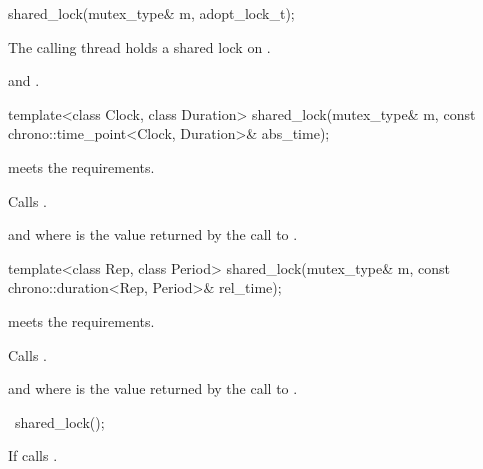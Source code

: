 %
\begin{itemdecl}
shared_lock(mutex_type& m, adopt_lock_t);
\end{itemdecl}

\begin{itemdescr}
\pnum
\expects
The calling thread holds a shared lock on .

\pnum
\ensures
{} and .
\end{itemdescr}

%
\begin{itemdecl}
template<class Clock, class Duration>
  shared_lock(mutex_type& m,
              const chrono::time_point<Clock, Duration>& abs_time);
\end{itemdecl}

\begin{itemdescr}
\pnum
\expects
{} meets the 
requirements.

\pnum
\effects
Calls .

\pnum
\ensures
{} and 
where 
is the value returned by the call to .
\end{itemdescr}

%
\begin{itemdecl}
template<class Rep, class Period>
  shared_lock(mutex_type& m,
              const chrono::duration<Rep, Period>& rel_time);
\end{itemdecl}

\begin{itemdescr}
\pnum
\expects
{} meets the 
requirements.

\pnum
\effects
Calls .

\pnum
\ensures
{} and 
where  is
the value returned by the call to .
\end{itemdescr}

%
\begin{itemdecl}
~shared_lock();
\end{itemdecl}

\begin{itemdescr}
\pnum
\effects
If  calls .
\end{itemdescr}

